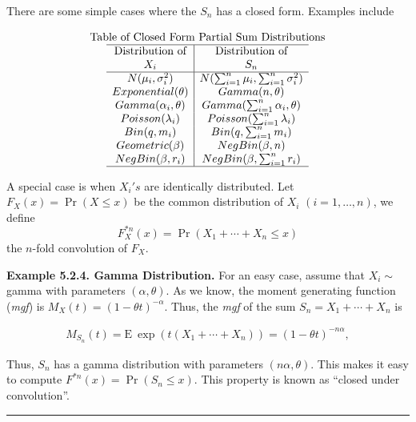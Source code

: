 \documentclass[]{book}
\theoremstyle{definition}
\theoremstyle{definition}
\theoremstyle{definition}
\theoremstyle{remark}
\begin{document}
There are some simple cases where the \(S_n\) has a closed form.
Examples include

\[\begin{matrix}
\text{Table of Closed Form Partial Sum Distributions}\\
    \begin{array}{c|c} \hline
        \text{Distribution of} & \text{Distribution of}   \\
        X_i   &  S_n  \\ \hline
N(\mu_i,\sigma_i^2) & N(\sum_{i=1}^{n}\mu_i,\sum_{i=1}^{n}\sigma_i^2) \\
Exponential(\theta)& Gamma(n,\theta)\\  
Gamma(\alpha_i,\theta)& Gamma(\sum_{i=1}^n\alpha_i,\theta)\\  
Poisson(\lambda_i)& Poisson(\sum_{i=1}^{n}\lambda_i)\\  
Bin(q,m_i)& Bin(q,\sum_{i=1}^n m_i)\\  
 Geometric(\beta)& NegBin(\beta,n)\\  
NegBin(\beta,r_i)& NegBin(\beta,\sum_{i=1}^n r_i)\\  
\hline
    \end{array}
\end{matrix}\]

A special case is when \(X_i's\) are identically distributed. Let
\(F_X(x)={\Pr}(X\leq x)\) be the common distribution of \(X_i\)
\((i=1,\ldots,n)\), we define
\[F^{*n}_X(x)={\Pr}(X_1+\cdots+X_n\leq x)\] the \(n\)-fold convolution
of \(F_X\).

\textbf{Example 5.2.4. Gamma Distribution.} For an easy case, assume
that \(X_i \sim\) gamma with parameters \((\alpha, \theta)\). As we
know, the moment generating function (\emph{mgf}) is
\(M_{X}(t) = (1 - \theta t)^{- \alpha}\). Thus, the \emph{mgf} of the
sum \(S_n = X_1 + \cdots + X_n\) is

\begin{eqnarray*}
M_{S_n}(t) = \mathrm{E~} \exp(t(X_1 + \cdots + X_n)) = (1 - \theta t)^{-n \alpha} ,
\end{eqnarray*}

Thus, \(S_n\) has a gamma distribution with parameters
\((n \alpha, \theta)\). This makes it easy to compute
\(F^{\ast n}(x) = \Pr(S_n \le x).\) This property is known as ``closed
under convolution''.

\begin{center}\rule{0.5\linewidth}{\linethickness}\end{center}
\end{document}
